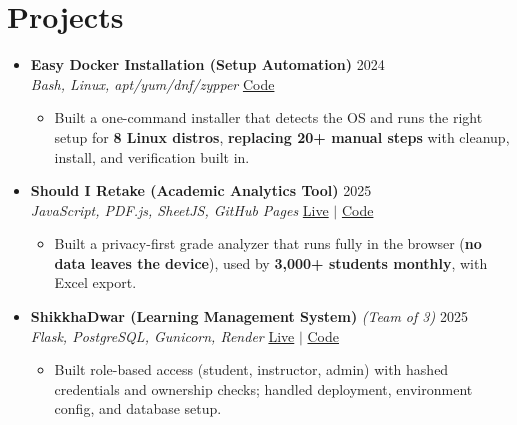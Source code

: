 \documentclass[a4paper]{article}
\newcommand{\resumeItem}[1]{
  \item\small{
    {#1 \vspace{-2pt}}
  }
}
\newcommand{\resumeItemListStart}{\begin{itemize}}
\newcommand{\resumeItemListEnd}{\end{itemize}\vspace{-5pt}}
\begin{document}
\section{Projects}
  \begin{itemize}[leftmargin=0.15in, label={}, itemsep=6pt]

    \item
    \textbf{Easy Docker Installation (Setup Automation)} \hfill 2024\\
    \small\textit{Bash, Linux, apt/yum/dnf/zypper} \hfill
    \href{https://github.com/badhon495/Easy_Docker_Installation}{Code}
    \vspace{-5pt}
    \resumeItemListStart
      \resumeItem{Built a one-command installer that detects the OS and runs the right setup for \textbf{8 Linux distros}, \textbf{replacing 20+ manual steps} with cleanup, install, and verification built in.}
    \resumeItemListEnd

    \item
    \textbf{Should I Retake (Academic Analytics Tool)} \hfill 2025\\
    \small\textit{JavaScript, PDF.js, SheetJS, GitHub Pages} \hfill
    \href{https://badhon495.github.io/should-i-retake/}{Live} $|$
    \href{https://github.com/badhon495/should-i-retake}{Code}
    \vspace{-5pt}
    \resumeItemListStart
      \resumeItem{Built a privacy-first grade analyzer that runs fully in the browser (\textbf{no data leaves the device}), used by \textbf{3,000+ students monthly}, with Excel export.}
    \resumeItemListEnd

    \item
    \textbf{ShikkhaDwar (Learning Management System)} \textit{\small (Team of 3)} \hfill 2025\\
    \small\textit{Flask, PostgreSQL, Gunicorn, Render} \hfill
    \href{https://shikkhadwar-81r2.onrender.com/}{Live} $|$
    \href{https://github.com/nihal-kabir/ShikkhaDwar}{Code}
    \vspace{-5pt}
    \resumeItemListStart
      \resumeItem{Built role-based access (student, instructor, admin) with hashed credentials and ownership checks; handled deployment, environment config, and database setup.}
    \resumeItemListEnd

  \end{itemize}


\end{document}

